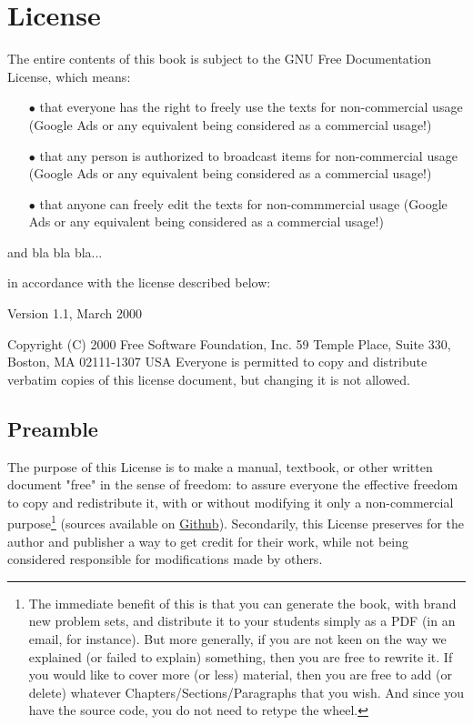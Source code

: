 	\newpage
	\thispagestyle{empty}
	\mbox{}
	\section{License}
	The entire contents of this book is subject to the GNU Free Documentation License, which means:
	\begin{itemize}
			\item[$\bullet$] that everyone has the right to freely use the texts for non-commercial usage (Google Ads or any equivalent being considered as a commercial usage!)
			\item[$\bullet$] that any person is authorized to broadcast items for non-commercial usage (Google Ads or any equivalent being considered as a commercial usage!)
			\item[$\bullet$] that anyone can freely edit the texts for non-commmercial usage (Google Ads or any equivalent being considered as a commercial usage!)
	\end{itemize}
	
	and bla bla bla...

	in accordance with the license described below: 

	\begin{center}
	Version 1.1, March 2000
		
	Copyright (C) 2000 Free Software Foundation, Inc. 59 Temple Place, Suite 330, Boston, MA 02111-1307 USA Everyone is permitted to copy and distribute verbatim copies of this license document, but changing it is not allowed. 
	\end{center}

	\subsection{Preamble} 

	The purpose of this License is to make a manual, textbook, or other written document "free" in the sense of freedom: to assure everyone the effective freedom to copy and redistribute it, with or without modifying it only a non-commercial purpose\footnote{The immediate benefit of this is that you can generate the book, with brand new  problem sets, and distribute it to your students simply as a PDF (in an email, for instance). But more generally, if you are not keen on the way we explained (or failed to explain) something, then you are free to rewrite it. If you would like to cover more (or less) material, then you are free to add (or delete) whatever Chapters/Sections/Paragraphs
that you wish. And since you have the source code, you do not need to retype the wheel.} (sources available on \href{https://github.com/vincentisoz}{Github}). Secondarily, this License preserves for the author and publisher a way to get credit for their work, while not being considered responsible for modifications made by others.

